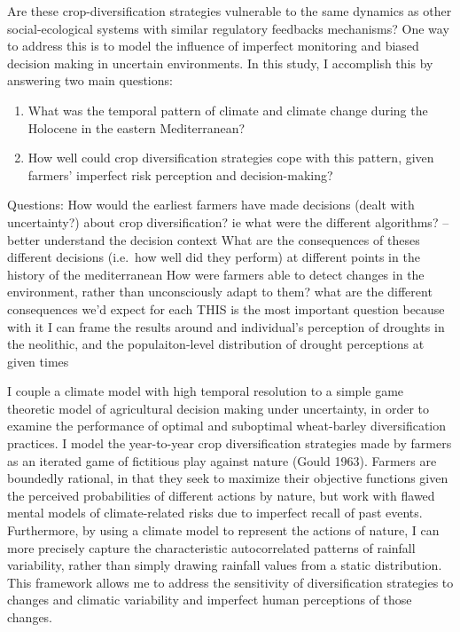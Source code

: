 \documentclass[smallextended]{svjour3}       %
\providecommand{\tightlist}{%
  \setlength{\itemsep}{0pt}\setlength{\parskip}{0pt}}
\begin{document}
Are these crop-diversification strategies vulnerable to the same
dynamics as other social-ecological systems with similar regulatory
feedbacks mechanisms? One way to address this is to model the influence
of imperfect monitoring and biased decision making in uncertain
environments. In this study, I accomplish this by answering two main
questions:

\begin{enumerate}
\def\labelenumi{\arabic{enumi}.}
\tightlist
\item
  What was the temporal pattern of climate and climate change during the
  Holocene in the eastern Mediterranean?
\item
  How well could crop diversification strategies cope with this pattern,
  given farmers' imperfect risk perception and decision-making?
\end{enumerate}

Questions: How would the earliest farmers have made decisions (dealt
with uncertainty?) about crop diversification? ie what were the
different algorithms? -- better understand the decision context What are
the consequences of theses different decisions (i.e.~how well did they
perform) at different points in the history of the mediterranean How
were farmers able to detect changes in the environment, rather than
unconsciously adapt to them? what are the different consequences we'd
expect for each THIS is the most important question because with it I
can frame the results around and individual's perception of droughts in
the neolithic, and the populaiton-level distribution of drought
perceptions at given times

I couple a climate model with high temporal resolution to a simple game
theoretic model of agricultural decision making under uncertainty, in
order to examine the performance of optimal and suboptimal wheat-barley
diversification practices. I model the year-to-year crop diversification
strategies made by farmers as an iterated game of fictitious play
against nature (Gould 1963). Farmers are boundedly rational, in that
they seek to maximize their objective functions given the perceived
probabilities of different actions by nature, but work with flawed
mental models of climate-related risks due to imperfect recall of past
events. Furthermore, by using a climate model to represent the actions
of nature, I can more precisely capture the characteristic
autocorrelated patterns of rainfall variability, rather than simply
drawing rainfall values from a static distribution. This framework
allows me to address the sensitivity of diversification strategies to
changes and climatic variability and imperfect human perceptions of
those changes.
\end{document}
